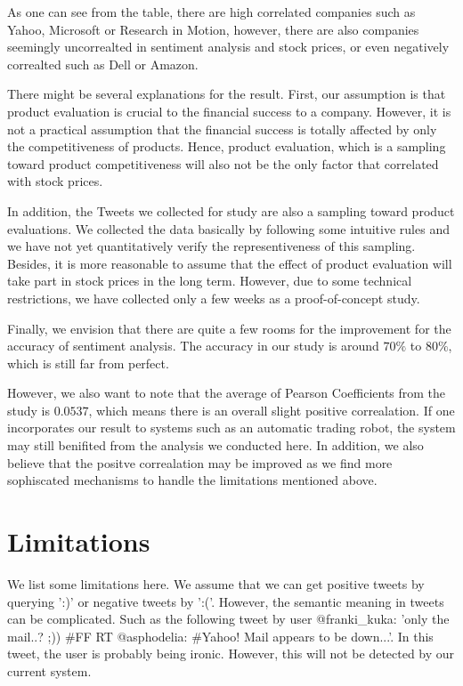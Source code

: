 \documentclass[12pt]{article}
\begin{document}
As one can see from the table, there are high correlated companies such as Yahoo, Microsoft or Research in Motion, however, there are also companies seemingly uncorrealted in sentiment analysis and stock prices, or even negatively correalted such as Dell or Amazon.

There might be several explanations for the result. First, our assumption is that product evaluation is crucial to the financial success to a company. However, it is not a practical assumption that the financial success is totally affected by only the competitiveness of products. Hence, product evaluation, which is a sampling toward product competitiveness will also not be the only factor that correlated with stock prices.

In addition, the Tweets we collected for study are also a sampling toward product evaluations. We collected the data basically by following some intuitive rules and we have not yet quantitatively verify the representiveness of this sampling. Besides, it is more reasonable to assume that the effect of product evaluation will take part in stock prices in the long term. However, due to some technical restrictions, we have collected only a few weeks as a proof-of-concept study.

Finally, we envision that there are quite a few rooms for the improvement for the accuracy of sentiment analysis. The accuracy in our study is around $70\%$ to $80\%$, which is still far from perfect.

However, we also want to note that the average of Pearson Coefficients from the study is $0.0537$, which means there is an overall slight positive correalation. If one incorporates our result to systems such as an automatic trading robot, the system may still benifited from the analysis we conducted here. In addition, we also believe that the positve correalation may be improved as we find more sophiscated mechanisms to handle the limitations mentioned above.

\section{Limitations}
We list some limitations here. We assume that we can get positive tweets by querying ':)' or negative tweets by ':('. However, the semantic meaning in tweets can be complicated. Such as the following tweet by user @franki\_kuka: 'only the mail..? ;)) \#FF RT @asphodelia: \#Yahoo! Mail appears to be down...'. In this tweet, the user is probably being ironic. However, this will not be detected by our current system.
\end{document}
